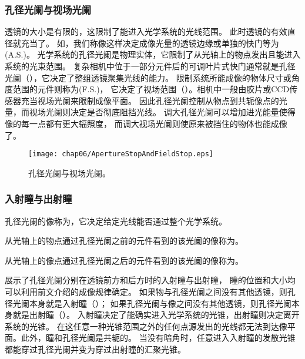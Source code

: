 \subsubsection{孔径光阑与视场光阑}
透镜的大小是有限的，这限制了能进入光学系统的光线范围。
此时透镜的有效直径就充当了。
如，我们称像这样决定成像光量的透镜边缘或单独的快门等为(A.S.)。
光学系统的孔径光阑是物理实体，它限制了从光轴上的物点发出且能进入系统的光束范围。
复杂相机中位于一部分元件后的可调叶片式快门通常就是孔径光阑（），它决定了整组透镜聚集光线的能力。
限制系统所能成像的物体尺寸或角度范围的元件则称为(F.S.)，
它决定了视场范围（）。相机中一般由胶片或CCD传感器充当视场光阑来限制成像平面。
因此孔径光阑控制从物点到共轭像点的光量，而视场光阑则决定是否彻底阻挡光线。
调大孔径光阑可以增加进光能量使得像的每一点都有更大辐照度，
而调大视场光阑则使原来被挡住的物体也能成像了。
\begin{figure}[htbp]
    \centering\texttt{[image: chap06/ApertureStopAndFieldStop.eps]}
    \caption{孔径光阑与视场光阑。}
    \label{fig:6.48}
\end{figure}

\subsubsection{入射瞳与出射瞳}
孔径光阑的像称为，它决定给定光线能否通过整个光学系统。
\begin{definition}
    从光轴上的物点通过孔径光阑之前的元件看到的该光阑的像称为。
\end{definition}
\begin{definition}
    从光轴上的像点通过孔径光阑之后的元件看到的该光阑的像称为。
\end{definition}

展示了孔径光阑分别在透镜前方和后方时的入射瞳与出射瞳，
瞳的位置和大小均可以利用前文介绍的成像规律确定。
如果物与孔径光阑之间没有其他透镜，则孔径光阑本身就是入射瞳（）；
如果孔径光阑与像之间没有其他透镜，则孔径光阑本身就是出射瞳（）。
入射瞳决定了能确实进入光学系统的光锥，出射瞳则决定离开系统的光锥。
在这任意一种光锥范围之外的任何点源发出的光线都无法到达像平面。此外，瞳和孔径光阑是共轭的。
当没有暗角时，任意进入入射瞳的发散光锥都能穿过孔径光阑并变为穿过出射瞳的汇聚光锥。

